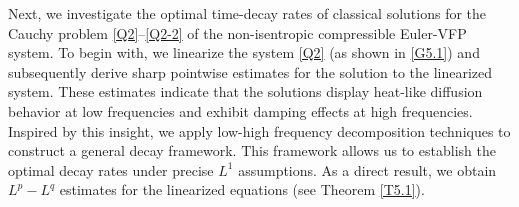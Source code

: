 \documentclass[reqno,11pt]{amsart}
\theoremstyle{plain}
\numberwithin{equation}{section}
\begin{document}
Next, we investigate the optimal time-decay rates of classical solutions for the Cauchy problem \eqref{Q2}--\eqref{Q2-2}
of the non-isentropic compressible Euler-VFP system. To begin with, we linearize the system \eqref{Q2} 
(as shown in \eqref{G5.1}) and subsequently derive sharp pointwise estimates for the solution to
 the linearized system. These estimates indicate that the 
 solutions display heat-like diffusion behavior at low frequencies 
 and exhibit damping effects at high frequencies. Inspired by this insight, 
 we apply low-high frequency decomposition techniques to construct a general decay framework. 
 This framework allows us to establish the  optimal decay rates under precise $L^1$ assumptions. 
 As a direct result, we obtain $L^p-L^q$ estimates for the linearized equations (see Theorem \ref{T5.1}).
\end{document}
